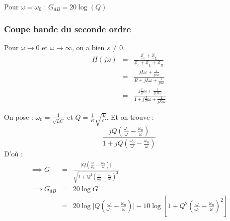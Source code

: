 Pour \(\omega = \omega_{\text{0}}\) : \(G_{dB} = 20 \log \left( Q \right)\)  


\subsubsection{Coupe bande du seconde ordre}

Pour \(\omega \to  0 \) et \(\omega \to  \infty\), on a bien \(s \neq 0\). 
\begin{eqnarray*}
    \underline{H}(j \omega) &=& \frac{\underline{Z}_{c} + \underline{Z}_{L}}{\underline{Z}_{c} + \underline{Z}_{L} + \underline{Z}_{R}} \\
    &=& \frac{jL \omega + \frac{1}{jc \omega}}{R + jL \omega + \frac{1}{jc \omega}} \\
    &=& \frac{j \frac{L}{R} \omega + \frac{1}{jcR \omega}}{1+ j \frac{L}{R} \omega + \frac{1}{jRc \omega}}
\end{eqnarray*}
   
On pose : \(\omega_{\text{0}} = \frac{1}{\sqrt{LC}}\) et \(Q = \frac{1}{R}\sqrt{\frac{L}{C}}\). Et on trouve : 
\[
    \frac{jQ(\frac{\omega_{\text{0}}}{\omega} - \frac{\omega_{\text{0}}}{\omega})}{1+ jQ(\frac{\omega_{\text{0}}}{\omega} - \frac{\omega_{\text{0}}}{\omega})}
\]  
D'où : 
\begin{eqnarray*}
    \implies G &=& \frac{\lvert Q(\frac{\omega}{\omega_{\text{0}}} - \frac{\omega_{\text{0}}}{\omega}) \rvert }{\sqrt{1+Q^{2}(\frac{\omega}{\omega_{\text{0}}}- \frac{\omega_{\text{0}}}{\omega})^{2}}} \\
    \implies G_{dB} &=& 20 \log G \\
    &=& 20\log \lvert Q(\frac{\omega}{\omega_{\text{0}}} - \frac{\omega_{\text{0}}}{\omega}) \rvert -10 \log \left[  1+Q^{2}(\frac{\omega}{\omega_{\text{0}}}- \frac{\omega_{\text{0}}}{\omega})^{2} \right]
\end{eqnarray*}
